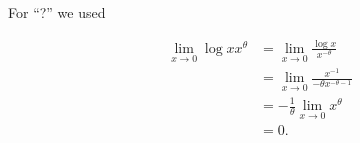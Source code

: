 \begin{solution}
For \enquote ? we used

\begin{align*}
    \lim_{x \to 0}
        \log x x^\theta
    & =
    \lim_{x \to 0}
        \frac{\log x}{x^{-\theta}} \\
    & =
    \lim_{x \to 0}
        \frac{x^{-1}}{- \theta x^{-\theta-1}} \\
    & =
    -\frac{1}{\theta} \lim_{x \to 0} x^\theta \\
    & =
    0.
\end{align*}

\end{solution}

